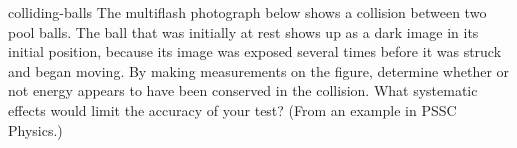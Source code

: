 \begin{hwsection}
\begin{hw}{colliding-balls}
	The multiflash photograph below shows a collision
	between two pool balls. The ball that was initially at rest
	shows up as a dark image in its initial position, because
	its image was exposed several times before it was struck and
	began moving. By making measurements on the figure,
	determine whether or not energy appears to have been
	conserved in the collision. What systematic effects would
	limit the accuracy of your test? (From an example in PSSC
	Physics.)
\end{hw}

\end{hwsection}



